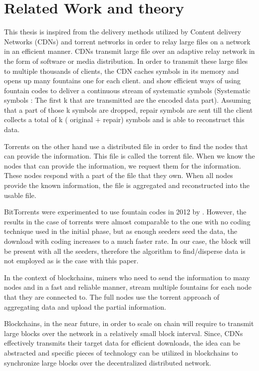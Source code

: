 \chapter{Related Work and theory}
This thesis is inspired from the delivery methods utilized by Content delivery
Networks (CDNs) \citep{cdn3} \citep{cdn4} \citep{cdn5} \citep{cdn6} and torrent networks in order to relay large files on a network in an
efficient manner. CDNs transmit large file over an adaptive relay network in the
form of software or media distribution. In order to transmit these large files
to multiple thousands of clients, the CDN caches symbols in its memory and opens
up many fountains one for each client.\citep{cdn1} and \citep{cdn2} show
efficient ways of using fountain codes to deliver a continuous stream
of systematic symbols (Systematic symbols : The first k that are transmitted are the encoded
data part). Assuming that a part of those k symbols are dropped, repair symbols
are sent till the client collects a total of k ( original + repair) symbols and
is able to reconstruct this data.

Torrents on the other hand use a distributed file in order to find the nodes
that can provide the information. This file is called the torrent file. When we
know the nodes that can provide the information, we request them for the
information. These nodes respond with a part of the file that they own. When all
nodes provide the known information, the file is aggregated and reconstructed
into the usable file.

BitTorrents \citep{bittorrent1} \citep{cohem} were experimented to use fountain codes in 2012 by \citep{torrent-fountain}.
However, the results in the case of torrents were almost comparable to the one
with no coding technique used in the initial phase, but as enough seeders seed
the data, the download with coding increases to a much faster rate. In our case,
the block will be present with all the seeders, therefore the algorithm to
find/disperse data is not employed as is the case with this paper.

In the context of blockchains, miners who need to send the information to many
nodes and in a fast and reliable manner, stream multiple fountains for each node
that they are connected to. The full nodes use the torrent approach of
aggregating data and upload the partial information.

Blockchains, in the near future, in order to scale on chain will require to
transmit large blocks over the network in a relatively small block interval.
Since, CDNs effectively transmits their target data for efficient downloads, the
idea can be abstracted and specific pieces of technology can be utilized in
blockchains to synchronize large blocks over the decentralized distributed
network.

